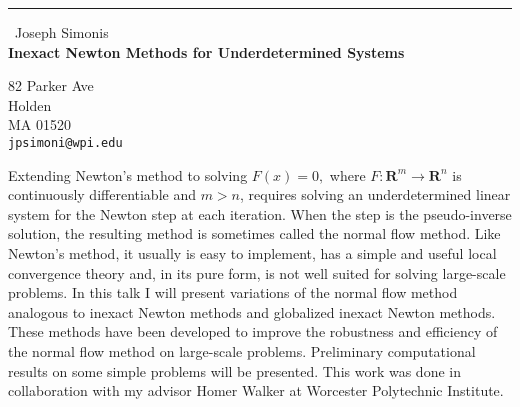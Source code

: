 \documentclass{report}
\begin{document}
\begin{center}
\rule{6in}{1pt} \
{\large Joseph Simonis \\
{\bf Inexact Newton Methods for Underdetermined Systems}}

82 Parker Ave \\ Holden \\ MA 01520
\\
{\tt jpsimoni@wpi.edu}\end{center}

Extending Newton's method to solving $F(x)=0,$ where
$F:\mathbf{R}^m\rightarrow\mathbf{R}^n$ is continuously differentiable
and $m>n$, requires solving an underdetermined linear system
for the Newton step at each iteration. When the step is the
pseudo-inverse solution, the resulting method is sometimes
called the normal flow method. Like Newton's method, it
usually is easy to implement, has a simple and useful local
convergence theory and, in its pure form, is not well suited
for solving large-scale problems.
In this talk I will present variations of the normal flow method
analogous to inexact Newton methods and globalized inexact
Newton methods. These methods have been developed to improve the
robustness and efficiency of the normal flow method on large-scale
problems. Preliminary computational results on some simple
problems will be presented. This work was done in collaboration with my
advisor Homer Walker at Worcester Polytechnic Institute.
\end{document}
